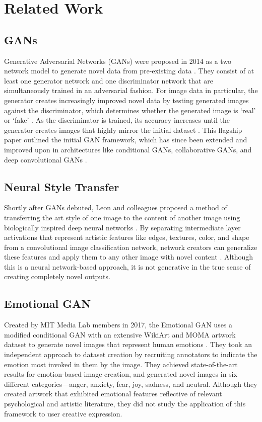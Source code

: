 \documentclass{sigchi}
\begin{document}
\section{Related Work}

\subsection{GANs}
Generative Adversarial Networks (GANs) were proposed in 2014 as a two network model to generate novel data from pre-existing data \cite{goodfellow2014generative}. They consist of at least one generator network and one discriminator network that are simultaneously trained in an adversarial fashion. For image data in particular, the generator creates increasingly improved novel data by testing generated images against the discriminator, which determines whether the generated image is ‘real’ or ‘fake’ \cite{goodfellow2014generative}.  As the discriminator is trained, its accuracy increases until the generator creates images that highly mirror the initial dataset \cite{goodfellow2014generative}. This flagship paper outlined the initial GAN framework, which has since been extended and improved upon in architectures like conditional GANs, collaborative GANs, and deep convolutional GANs  \cite{acgan}.

\subsection{Neural Style Transfer}
Shortly after GANs debuted, Leon and colleagues proposed a method of transferring the art style of one image to the content of another image using biologically inspired deep neural networks \cite{Gatys_2016}. By separating intermediate layer activations that represent artistic features like edges, textures, color, and shape from a convolutional image classification network, network creators can generalize these features and apply them to any other image with novel content \cite{Gatys_2016}. Although this is a neural network-based approach, it is not generative in the true sense of creating completely novel outputs. 

\subsection{Emotional GAN}
Created by MIT Media Lab members in 2017, the Emotional GAN uses a modified conditional GAN with an extensive WikiArt and MOMA artwork dataset to generate novel images that represent human emotions \cite{AlvarezMelis2017TheEG}. They took an independent approach to dataset creation by recruiting annotators to indicate the emotion most invoked in them by the image. They achieved state-of-the-art results for emotion-based image creation, and generated novel images in six different categories—anger, anxiety, fear, joy, sadness, and neutral. Although they created artwork that exhibited emotional features reflective of relevant psychological and artistic literature, they did not study the application of this framework to user creative expression.
\end{document}
